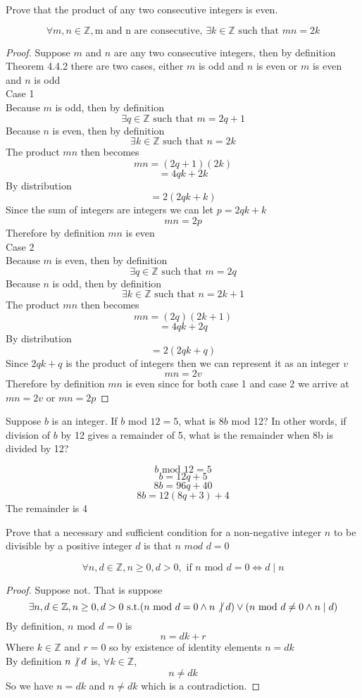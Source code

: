 \documentclass[12pt,letterpaper, onecolumn]{exam}
\newcommand{\doesnotdivide}{\not\hspace{2.5pt}\mid}
\begin{document}
\begin{questions}
\begin{solution}
		\end{solution}
		\setcounter{question}{16} \question Prove that the product of any two consecutive integers is even.
		\begin{solution}
			$$\forall m,n \in \mathbb{Z}, \textrm{m and n are consecutive, } \exists k \in \mathbb{Z} \textrm{ such that } mn=2k$$
			\begin{proof}
				Suppose $m$ and $n$ are any two consecutive integers, then by definition	
				Theorem 4.4.2 there are two cases, either $m$ is odd and $n$ is even or $m$ is even and $n$ is odd\\
				Case 1\\
				Because $m$ is odd, then by definition 
				$$\exists q \in \mathbb{Z} \textrm{ such that } m=2q+1$$
				Because $n$ is even, then by definition 
				$$\exists k \in \mathbb{Z} \textrm{ such that } n=2k$$
				The product $mn$ then becomes
				$$mn=(2q+1)(2k)$$
				$$=4qk+2k$$
				By distribution
				$$=2(2qk+k)$$
				Since the sum of integers are integers we can let $p=2qk+k$
				$$mn=2p$$
				Therefore by definition $mn$ is even\\
				Case 2\\
				Because $m$ is even, then by definition 
				$$\exists q \in \mathbb{Z} \textrm{ such that } m=2q$$
				Because $n$ is odd, then by definition 
				$$\exists k \in \mathbb{Z} \textrm{ such that } n=2k+1$$
				The product $mn$ then becomes
				$$mn=(2q)(2k+1)$$
				$$=4qk+2q$$
				By distribution
				$$=2(2qk+q)$$
				Since $2qk+q$ is the product of integers then we can represent it as an integer $v$
				$$mn=2v$$
				Therefore by definition $mn$ is even since for both case 1 and case 2 we  arrive at $mn=2v$ or $mn=2p$
			\end{proof}
		\end{solution}
		\setcounter{question}{20} \question Suppose $b$ is an integer. If $b$ mod $12=5$, what is $8b$ mod 12? In other words, if division of $b$ by 12 gives a remainder of 5, what is the remainder when 8b is divided by 12?
		\begin{solution}
			$$b \textrm{ mod } 12 =5 $$
			$$b=12q+5$$
			$$8b=96q+40$$
			$$8b=12(8q+3)+4$$
			The remainder is 4
		\end{solution} 
		\setcounter{question}{25} \question Prove that a necessary and sufficient condition for a non-negative integer $n$ to be divisible by a positive integer $d$ is that $n$ $mod$ $d=0$
		\begin{solution}
			$$\forall n,d \in \mathbb{Z}, n\geq0, d>0, \textrm{ if }n \textrm{ mod } d=0 \Leftrightarrow d \mid n $$ 
			\begin{proof}
				Suppose not. That is suppose
		\[\exists n,d \in \mathbb{Z}, n\geq0, d>0 \textrm{ s.t.}(n\textrm{ mod } d=0 \land n\doesnotdivide d)\lor(n \textrm{ mod } d\neq0 \land n \mid d)\]
				By definition, $n \textrm{ mod } d=0$ is
				$$n=dk+r$$
				Where $k\in\mathbb{Z}$ and $r=0$ so by existence of identity elements $n=dk$\\
				By definition $n\doesnotdivide d$ is, $\forall k \in \mathbb{Z}$,
				$$n\neq dk$$
				So we have $n=dk$ and $n\neq dk$ which is a contradiction. 
				

\end{proof}
\end{solution}
\end{questions}
\end{document}
